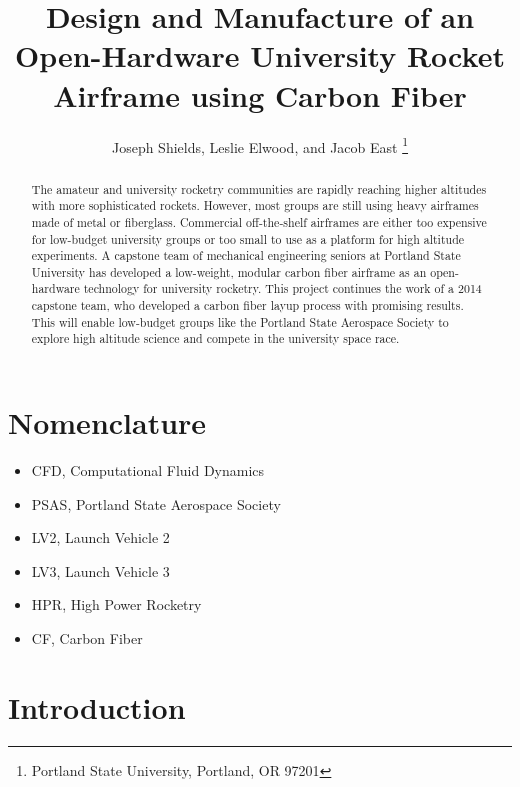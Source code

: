 \documentclass{aiaa-tc}%
\title{Design and Manufacture of an Open-Hardware 
 	University Rocket Airframe using Carbon Fiber}
\author{
Joseph Shields, Leslie Elwood, and Jacob East%
	\thanks{Portland State University, Portland, OR 97201}
 }
\begin{document}
\maketitle

\begin{abstract}
The amateur and university rocketry communities are rapidly reaching higher altitudes with more sophisticated rockets. However, most groups are still using heavy airframes made of metal or fiberglass. Commercial off-the-shelf airframes are either too expensive for low-budget university groups or too small to use as a platform for high altitude experiments. 
A capstone team of mechanical engineering seniors at Portland State University has developed a low-weight, modular carbon fiber airframe as an open-hardware technology for university rocketry. 
This project continues the work of a 2014 capstone team, who developed a carbon fiber layup process with promising results. 
This will enable low-budget groups like the Portland State Aerospace Society to explore high altitude science and compete in the university space race.  \end{abstract}

\section*{Nomenclature}
\begin{itemize}
	\item CFD, Computational Fluid Dynamics
	\item PSAS, Portland State Aerospace Society
	\item LV2, Launch Vehicle 2
	\item LV3, Launch Vehicle 3
	\item HPR, High Power Rocketry
	\item CF, Carbon Fiber
\end{itemize}


\section{Introduction}
\end{document}
